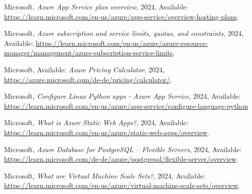 \documentclass{llncs}
\begin{document}
\begin{thebibliography}{9}

    Microsoft,
    \emph{Azure App Service plan overview},
    2024, Available:
    \url{https://learn.microsoft.com/en-us/azure/app-service/overview-hosting-plans}.

    Microsoft,
    \emph{Azure subscription and service limits, quotas, and constraints},
    2024, Available:
    \url{https://learn.microsoft.com/en-us/azure/azure-resource-manager/management/azure-subscription-service-limits}.

    Microsoft, Available:
    \emph{Azure Pricing Calculator}, 2024,
    \url{https://azure.microsoft.com/de-de/pricing/calculator/}.

    Microsoft,
    \emph{Configure Linux Python apps - Azure App Service},
    2024, Available:
    \url{https://learn.microsoft.com/en-us/azure/app-service/configure-language-python}

    Microsoft,
    \emph{What is Azure Static Web Apps?}, 2024,
    Available: \url{https://learn.microsoft.com/en-us/azure/static-web-apps/overview}.

    Microsoft,
    \emph{Azure Database for PostgreSQL – Flexible Servers}, 2024,
    Available: \url{https://learn.microsoft.com/de-de/azure/postgresql/flexible-server/overview}.

    Microsoft,
    \emph{What are Virtual Machine Scale Sets?}, 2024,
    Available: \url{https://learn.microsoft.com/en-us/azure/virtual-machine-scale-sets/overview}.

\end{thebibliography}
\end{document}
